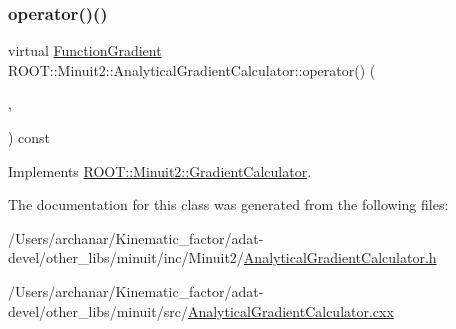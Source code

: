 \subsubsection{\texorpdfstring{operator()()}{operator()()}\hspace{0.1cm}{\footnotesize\ttfamily [6/6]}}
{\footnotesize\ttfamily virtual \mbox{\hyperlink{classROOT_1_1Minuit2_1_1FunctionGradient}{Function\+Gradient}} R\+O\+O\+T\+::\+Minuit2\+::\+Analytical\+Gradient\+Calculator\+::operator() (\begin{DoxyParamCaption}\item[{const \mbox{\hyperlink{classROOT_1_1Minuit2_1_1MinimumParameters}{Minimum\+Parameters}} \&}]{,  }\item[{const \mbox{\hyperlink{classROOT_1_1Minuit2_1_1FunctionGradient}{Function\+Gradient}} \&}]{ }\end{DoxyParamCaption}) const\hspace{0.3cm}{\ttfamily [virtual]}}



Implements \mbox{\hyperlink{classROOT_1_1Minuit2_1_1GradientCalculator_a1809c1e8a89d32aabf7835e9690c2916}{R\+O\+O\+T\+::\+Minuit2\+::\+Gradient\+Calculator}}.



The documentation for this class was generated from the following files\+:\begin{DoxyCompactItemize}
\item 
/\+Users/archanar/\+Kinematic\+\_\+factor/adat-\/devel/other\+\_\+libs/minuit/inc/\+Minuit2/\mbox{\hyperlink{adat-devel_2other__libs_2minuit_2inc_2Minuit2_2AnalyticalGradientCalculator_8h}{Analytical\+Gradient\+Calculator.\+h}}\item 
/\+Users/archanar/\+Kinematic\+\_\+factor/adat-\/devel/other\+\_\+libs/minuit/src/\mbox{\hyperlink{adat-devel_2other__libs_2minuit_2src_2AnalyticalGradientCalculator_8cxx}{Analytical\+Gradient\+Calculator.\+cxx}}\end{DoxyCompactItemize}
